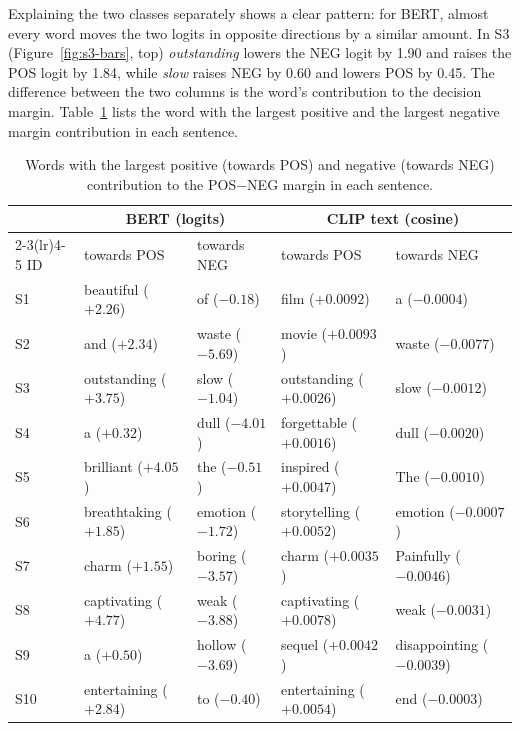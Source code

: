 \documentclass[11pt,a4paper]{article}
\begin{document}
Explaining the two classes separately shows a clear pattern: for BERT, almost every word
moves the two logits in opposite directions by a similar amount. In S3
(Figure~\ref{fig:s3-bars}, top) \emph{outstanding} lowers the NEG logit by 1.90 and raises
the POS logit by 1.84, while \emph{slow} raises NEG by 0.60 and lowers POS by 0.45. The
difference between the two columns is the word's contribution to the decision margin.
Table~\ref{tab:s-words} lists the word with the largest positive and the largest negative
margin contribution in each sentence.

\begin{table}[H]
  \centering
  \caption[Strongest margin words per sentence for BERT and CLIP text]{Words with the
           largest positive (towards POS) and negative (towards NEG) contribution to the
           POS$-$NEG margin in each sentence.}
  \label{tab:s-words}
  \small
  \begin{tabular}{@{}l l l l l@{}}
    \toprule
    & \multicolumn{2}{c}{BERT (logits)} & \multicolumn{2}{c}{CLIP text (cosine)} \\
    \cmidrule(lr){2-3}\cmidrule(lr){4-5}
    ID & towards POS & towards NEG & towards POS & towards NEG \\
    \midrule
    S1  & beautiful ($+2.26$)    & of ($-0.18$)         & film ($+0.0092$)         & a ($-0.0004$) \\
    S2  & and ($+2.34$)          & waste ($-5.69$)      & movie ($+0.0093$)        & waste ($-0.0077$) \\
    S3  & outstanding ($+3.75$)  & slow ($-1.04$)       & outstanding ($+0.0026$)  & slow ($-0.0012$) \\
    S4  & a ($+0.32$)            & dull ($-4.01$)       & forgettable ($+0.0016$)  & dull ($-0.0020$) \\
    S5  & brilliant ($+4.05$)    & the ($-0.51$)        & inspired ($+0.0047$)     & The ($-0.0010$) \\
    S6  & breathtaking ($+1.85$) & emotion ($-1.72$)    & storytelling ($+0.0052$) & emotion ($-0.0007$) \\
    S7  & charm ($+1.55$)        & boring ($-3.57$)     & charm ($+0.0035$)        & Painfully ($-0.0046$) \\
    S8  & captivating ($+4.77$)  & weak ($-3.88$)       & captivating ($+0.0078$)  & weak ($-0.0031$) \\
    S9  & a ($+0.50$)            & hollow ($-3.69$)     & sequel ($+0.0042$)       & disappointing ($-0.0039$) \\
    S10 & entertaining ($+2.84$) & to ($-0.40$)         & entertaining ($+0.0054$) & end ($-0.0003$) \\
    \bottomrule
  \end{tabular}
\end{table}
\end{document}
